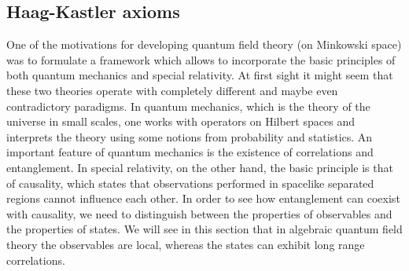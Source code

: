 \documentclass[12pt]{article}
\newcommand{\1}{\mathds{1}}                         %
\begin{document}
\subsection{Haag-Kastler axioms}\label{AQFTaxioms}
One of the motivations for developing quantum field theory (on Minkowski space) was to formulate a framework which allows to incorporate the basic principles of both quantum mechanics and special relativity. At first sight it might seem that these two theories operate with completely different and maybe even contradictory paradigms. In quantum mechanics, which is the theory of the universe in small scales, one works with operators on Hilbert spaces and interprets the theory using some notions from probability and statistics. An important feature of quantum mechanics is the existence of correlations and entanglement. In special relativity, on the other hand, the basic principle is that of causality, which states that observations performed in spacelike separated regions cannot influence each other. In order to see how entanglement can coexist with causality, we need to distinguish between the properties of observables and the properties of states. We will see in this section that in algebraic quantum field theory the observables are local, whereas the states can exhibit long range correlations.
\end{document}

